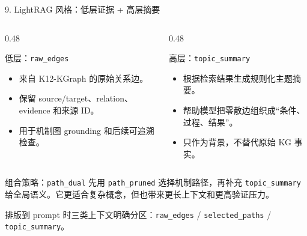 \documentclass[aspectratio=169,UTF8]{ctexbeamer}
\newcommand{\code}[1]{\texttt{#1}}
\begin{document}
\begin{frame}{9. LightRAG 风格：低层证据 + 高层摘要}
  \small
  \begin{columns}[T,onlytextwidth]
    \begin{column}{0.48\textwidth}
      \begin{block}{低层：\code{raw\_edges}}
        \begin{itemize}
          \item 来自 K12-KGraph 的原始关系边。
          \item 保留 source/target、relation、evidence 和来源 ID。
          \item 用于机制图 grounding 和后续可追溯检查。
        \end{itemize}
      \end{block}
    \end{column}
    \begin{column}{0.48\textwidth}
      \begin{block}{高层：\code{topic\_summary}}
        \begin{itemize}
          \item 根据检索结果生成规则化主题摘要。
          \item 帮助模型把零散边组织成“条件、过程、结果”。
          \item 只作为背景，不替代原始 KG 事实。
        \end{itemize}
      \end{block}
    \end{column}
  \end{columns}

  \vspace{0.6em}
  \begin{block}{组合策略：\code{path\_dual}}
    先用 \code{path\_pruned} 选择机制路径，再补充 \code{topic\_summary} 给全局语义。它更适合复杂概念，但也带来更长上下文和更高验证压力。
  \end{block}

  \vspace{0.3em}
  \footnotesize
  排版到 prompt 时三类上下文明确分区：\code{raw\_edges} / \code{selected\_paths} / \code{topic\_summary}。
\end{frame}
\end{document}
